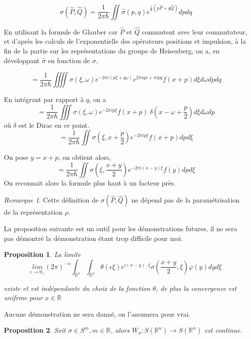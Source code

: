 \documentclass[a4paper, 12pt]{report}
\newcommand{\R}{\mathbb{R}} %
\newcommand{\ra}[1][]{\overset{#1}{\rightarrow}} %
\renewcommand{\.}{\cdot} %
\theoremstyle{break}
\newtheorem{proposition}{Proposition}
\theoremstyle{remark}
\newtheorem{remark}{Remarque}
\theoremstyle{proofstyle}
\begin{document}
$$\sigma(\hat{P},\hat{Q}) = \frac{1}{2 \pi \hbar} \iint \hat{\sigma} (p,q) e^{ \frac{i}{\hbar}(p\hat{P}+q\hat{Q})} dpdq$$

En utilisant la formule de Glauber car $\hat{P}$ et $\hat{Q}$ commutent avec leur commutateur, et d'après les calculs de l'exponentielle des opérateurs positions et impulsion, à la fin de la partie sur les représentations du groupe de Heisenberg, on a, en développant $\hat{\sigma}$ en fonction de $\sigma$,

$$= \frac{1}{2 \pi \hbar} \iiiint \sigma (\xi,\omega) e^{-2 \pi i (p \xi + q \omega)} e^{2 \pi i q x + \pi i p q} f(x+p) d \xi d \omega dpdq$$

En intégrant par rapport à $q$, on a
$$= \frac{1}{2 \pi \hbar} \iiint \sigma (\xi,\omega) e^{-2 \pi i p \xi} f(x+p)~ \delta\left(x-\omega + \frac{p}{2}\right) d \xi d \omega dp$$
où $\delta$ est le Dirac en ce point.
$$= \frac{1}{2 \pi \hbar} \iint \sigma \left(\xi,x+\frac{p}{2}\right) e^{-2 \pi i p \xi} f(x+p)  dp d \xi $$

On pose $y=x+p$, on obtient alors,
$$= \frac{1}{2 \pi \hbar} \iint \sigma \left(\xi,\frac{x+y}{2}\right) e^{-2 \pi i (x-y) \xi} f(y) dp d \xi $$
On reconnait alors la formule plus haut à un facteur près.

\begin{remark}
    Cette définition de $\sigma(\hat{P}, \hat{Q})$ ne dépend pas de la paramétrisation de la représentation $\rho$.
\end{remark}

\vspace{10pt}


La proposition suivante est un outil pour les démonstrations futures, il ne sera pas démontré la démonstration étant trop difficile pour moi.

\begin{proposition}%
    La limite
    $$\underset{\epsilon \ra 0_+}{lim} (2 \pi)^{-n} \int_{\R^n} \int_{\R^n} \theta( \epsilon \xi) e^{i(x-y) \. \xi} \sigma(\frac{x+y}{2}, \xi) \varphi(y) dy d\xi$$

    existe et est indépendante du choix de la fonction $\theta$, de plus la convergence est unifrme pour $x \in \R$
\end{proposition}

Aucune démonstration ne sera donné, on l'assumera pour vrai.


\begin{proposition}
    Soit $\sigma \in S^m, m \in \R$, alors $W_\sigma : S(\R^n) \ra S(\R^n)$ est continue.
\end{proposition}
\end{document}
